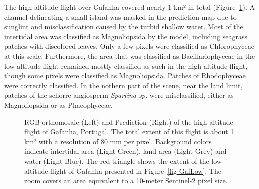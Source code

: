 \documentclass[
  number]{elsarticle}
\begin{document}
The high-altitude flight over Gafanha covered nearly 1 km² in total
(Figure~\ref{fig-GafHigh}). A channel delineating a small island was
masked in the prediction map due to sunglint and misclassification
caused by the turbid shallow water. Most of the intertidal area was
classified as Magnoliopsida by the model, including seagrass patches
with discolored leaves. Only a few pixels were classified as
Chlorophyceae at this scale. Furthermore, the area that was classified
as Bacillariophyceae in the low-altitude flight remained mostly
classified as such in the high-altitude flight, though some pixels were
classified as Magnoliopsida. Patches of Rhodophyceae were correctly
classified. In the nothern part of the scene, near the land limit,
patches of the schorre angiosperm \emph{Spartina sp.} were
misclassified, either as Magnoliopsida or as Phaeophyceae.

\label{cell-fig-GafHigh}
\begin{figure}[H]


\caption{\label{fig-GafHigh}RGB orthomosaic (Left) and Prediction
(Right) of the high altitude flight of Gafanha, Portugal. The total
extent of this flight is about 1 km² with a resolution of 80 mm per
pixel. Background colors indicate intertidal area (Light Green), land
area (Light Grey) and water (Light Blue). The red triangle shows the
extent of the low altitude flight of Gafanha presented in
Figure~\ref{fig-GafLow}. The zoom covers an area equivalent to a
10-meter Sentinel-2 pixel size.}

\end{figure}%
\end{document}
